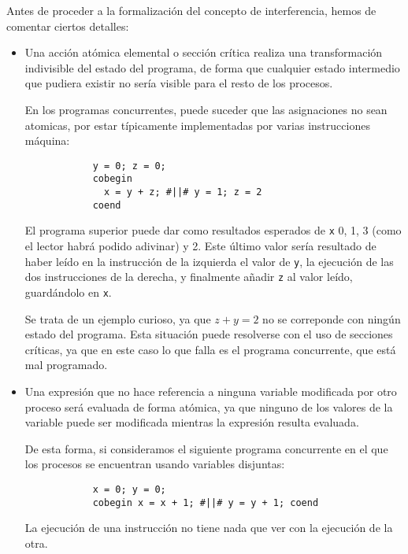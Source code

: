 Antes de proceder a la formalización del concepto de interferencia, hemos de comentar ciertos detalles:
\begin{itemize}
    \item Una acción atómica elemental o sección crítica realiza una transformación indivisible del estado del programa, de forma que cualquier estado intermedio que pudiera existir no sería visible para el resto de los procesos.

        En los programas concurrentes, puede suceder que las asignaciones no sean atomicas, por estar típicamente implementadas por varias instrucciones máquina:

        \begin{verbatim}
            y = 0; z = 0;
            cobegin
              x = y + z; #||# y = 1; z = 2
            coend
        \end{verbatim}
        El programa superior puede dar como resultados esperados de \verb|x| 0, 1, 3 (como el lector habrá podido adivinar) y 2. Este último valor sería resultado de haber leído en la instrucción de la izquierda el valor de \verb|y|, la ejecución de las dos instrucciones de la derecha, y finalmente añadir \verb|z| al valor leído, guardándolo en \verb|x|.

        Se trata de un ejemplo curioso, ya que $z+y=2$ no se correponde con ningún estado del programa. Esta situación puede resolverse con el uso de secciones críticas, ya que en este caso lo que falla es el programa concurrente, que está mal programado.
        
    \item Una expresión que no hace referencia a ninguna variable modificada por otro proceso será evaluada de forma atómica, ya que ninguno de los valores de la variable puede ser modificada mientras la expresión resulta evaluada.

        De esta forma, si consideramos el siguiente programa concurrente en el que los procesos se encuentran usando variables disjuntas:
        \begin{verbatim}
            x = 0; y = 0;
            cobegin x = x + 1; #||# y = y + 1; coend
        \end{verbatim}
        La ejecución de una instrucción no tiene nada que ver con la ejecución de la otra.
\end{itemize}

